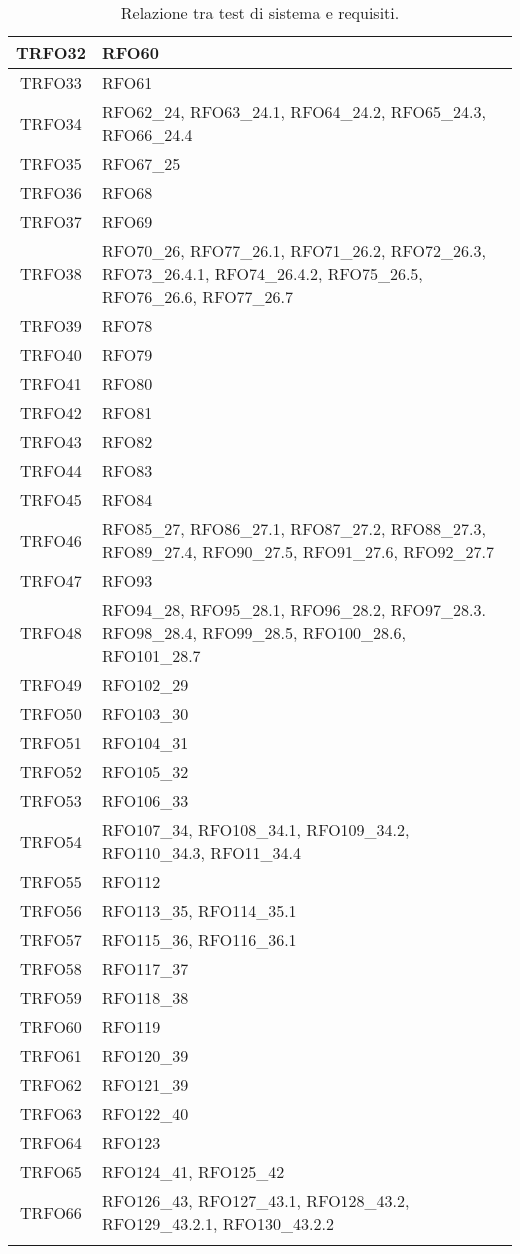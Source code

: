 \begin{longtable}{|c| C{13cm}|}
	TRFO32 & RFO60\\ \hline
	TRFO33 & RFO61\\ \hline
	TRFO34 & RFO62\_24, RFO63\_24.1, RFO64\_24.2, RFO65\_24.3, RFO66\_24.4\\ \hline
	TRFO35 & RFO67\_25\\ \hline
	TRFO36 & RFO68\\ \hline
	TRFO37 & RFO69\\ \hline
	TRFO38 & RFO70\_26, RFO77\_26.1, RFO71\_26.2, RFO72\_26.3, RFO73\_26.4.1, RFO74\_26.4.2, RFO75\_26.5, RFO76\_26.6, RFO77\_26.7\\ \hline
	TRFO39 & RFO78\\ \hline
	TRFO40 & RFO79\\ \hline
	TRFO41 & RFO80\\ \hline
	TRFO42 & RFO81\\ \hline
	TRFO43 & RFO82\\ \hline
	TRFO44 & RFO83\\ \hline
	TRFO45 & RFO84\\ \hline
	TRFO46 & RFO85\_27, RFO86\_27.1, RFO87\_27.2, RFO88\_27.3, RFO89\_27.4, RFO90\_27.5, RFO91\_27.6, RFO92\_27.7\\ \hline
	TRFO47 & RFO93\\ \hline
	TRFO48 & RFO94\_28, RFO95\_28.1, RFO96\_28.2, RFO97\_28.3. RFO98\_28.4, RFO99\_28.5, RFO100\_28.6, RFO101\_28.7\\ \hline
	TRFO49 & RFO102\_29\\ \hline
	TRFO50 & RFO103\_30\\ \hline
	TRFO51 & RFO104\_31\\ \hline
	TRFO52 & RFO105\_32\\ \hline
	TRFO53 & RFO106\_33\\ \hline
	TRFO54 & RFO107\_34, RFO108\_34.1, RFO109\_34.2, RFO110\_34.3, RFO11\_34.4\\ \hline
	TRFO55 & RFO112\\ \hline
	TRFO56 & RFO113\_35, RFO114\_35.1\\ \hline
	TRFO57 & RFO115\_36, RFO116\_36.1\\ \hline
	TRFO58 & RFO117\_37\\ \hline
	TRFO59 & RFO118\_38\\ \hline
	TRFO60 & RFO119\\ \hline
	TRFO61 & RFO120\_39\\ \hline
	TRFO62 & RFO121\_39\\ \hline
	TRFO63 & RFO122\_40\\ \hline
	TRFO64 & RFO123\\ \hline
	TRFO65 & RFO124\_41, RFO125\_42\\ \hline
	TRFO66 & RFO126\_43, RFO127\_43.1, RFO128\_43.2, RFO129\_43.2.1, RFO130\_43.2.2\\ 
	\caption{Relazione tra test di sistema e requisiti.}\\
\end{longtable}
\newpage
